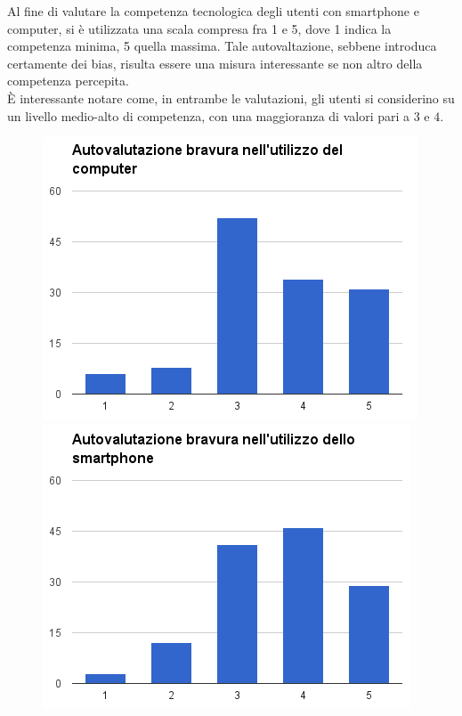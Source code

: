 Al fine di valutare la competenza tecnologica degli utenti con smartphone e computer, si è utilizzata
una scala compresa fra 1 e 5, dove 1 indica la competenza minima, 5 quella massima. Tale autovaltazione,
sebbene introduca certamente dei bias, risulta essere una misura interessante se non altro della competenza
percepita.
\\
È interessante notare come, in entrambe le valutazioni,
gli utenti si considerino su un livello medio-alto di competenza, con una maggioranza di valori pari a $3$ e $4$.
\begin{figure}[H]
\centering
\begin{minipage}{.48\textwidth}
	\includegraphics[scale=0.45]{img/chart_bravura_pc}
\end{minipage}
\hfill
\begin{minipage}{.49\textwidth}
	\includegraphics[scale=0.45]{img/chart_bravura_smartphone}
\end{minipage}
\end{figure}

